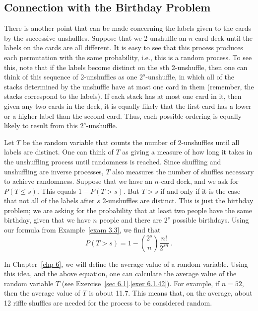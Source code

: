 \subsection*{Connection with the Birthday Problem} 
There is another point that can be made concerning the labels given to the cards
by the successive unshuffles.  Suppose that we 2-unshuffle an $n$-card deck until the
labels on the cards are all different.  It is easy to see that this process produces
each permutation with the same probability, i.e., this is a random process.  To see
this, note that if the labels become distinct on the $s$th 2-unshuffle, then one can
think of this sequence of 2-unshuffles as one $2^s$-unshuffle, in which all of the stacks
determined by the unshuffle have at most one card in them (remember, the stacks correspond to
the labels).  If each stack has at most one card in it, then given any two cards in the deck,
it is equally likely that the first card has a lower or a higher label than the second card.
Thus, each possible ordering is equally likely to result from this $2^s$-unshuffle. 
\par
Let $T$ be the random variable that counts the number of 2-unshuffles until all labels are 
distinct.  One can think of $T$ as giving a measure of how long it takes in the unshuffling process
until randomness is reached.  Since shuffling and unshuffling are inverse processes, $T$ also
measures the number of shuffles necessary to achieve randomness.  Suppose that we have an $n$-card
deck, and we ask for $P(T \le s)$.  This equals $1 - P(T > s)$.  But $T > s$ if and only if it is
the case that not all of the labels after $s$ 2-unshuffles are distinct.  This is just the birthday
problem; we are asking for the probability that at least two people have the same birthday, given
that we have $n$ people and there are $2^s$ possible birthdays.  Using our formula from
Example~\ref{exam 3.3}, we find that
\begin{equation}
P(T > s) = 1 - {{2^s} \choose n} \frac {n!}{2^{sn}}\ .
\label{eq 3.3.1}
\end{equation}
\par
In Chapter~\ref{chp 6}, we will define the average value of a random variable.  Using this idea, and
the above equation, one can calculate the average value of the random variable $T$  (see
Exercise~\ref{sec 6.1}.\ref{exer 6.1.42}).  For example, if
$n = 52$, then the average value of $T$ is about 11.7.  This means that, on the average, about 12
riffle shuffles are needed for the process to be considered random.


